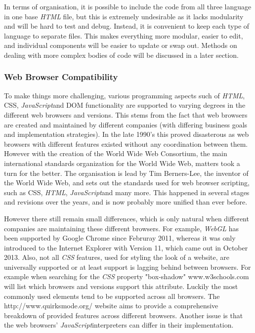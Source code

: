 \documentclass[a4paper,11pt,twoside]{article}
\begin{document}
In terms of organisation, it is possible to include the code from all three language in one base \textit{HTML} file, but this is extremely undesirable as it lacks modularity and will be hard to test and debug. Instead, it is convenient to keep each type of language to separate files. This makes everything more modular, easier to edit, and individual components will be easier to update or swap out. Methods on dealing with more complex bodies of code will be discussed in a later section.




\subsubsection{Web Browser Compatibility}

To make things more challenging, various programming aspects such of \textit{HTML}, CSS, \textit{JavaScript}and DOM functionality are supported to varying degrees in the different web browsers and versions. This stems from the fact that web browsers are created and maintained by different companies (with differing business goals and implementation strategies). In the late 1990's this proved disasterous as web browsers with different features existed without any coordination between them. However with the creation of the World Wide Web Consortium, the main international standards organization for the World Wide Web, matters took a turn for the better. The organisation is lead by Tim Berners-Lee, the inventor of the World Wide Web, and sets out the standards used for web browser scripting, such as CSS, \textit{HTML}, \textit{JavaScript}and many more. This happened in several stages and revisions over the years, and is now probably more unified than ever before. 

However there still remain small differences, which is only natural when different companies are maintaining these different browsers. For example, \textit{WebGL} has been supported by Google Chrome since Februray 2011, whereas it was only introduced to the Internet Explorer with Version 11, which came out in October 2013. Also, not all \textit{CSS} features, used for styling the look of a website, are universally supported or at least support is lagging behind between browsers. For example when searching for the \textit{CSS} property "box-shadow" www.w3schools.com will list which browsers and versions support this attribute. Luckily the most commonly used elements tend to be supported across all browsers. The http://www.quirksmode.org/ website aims to provide a comprehensive breakdown of provided features across different browsers. Another issue is that the web browsers' \textit{JavaScript}interpreters can differ in their implementation.
\end{document}
